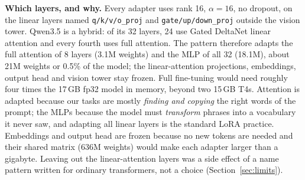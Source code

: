 \documentclass[11pt,a4paper]{article}
\begin{document}
\textbf{Which layers, and why.} Every adapter uses rank 16, $\alpha=16$, no dropout, on the linear layers named
\texttt{q/k/v/o\_proj} and \texttt{gate/up/down\_proj} outside the vision tower. Qwen3.5 is a hybrid: of its 32 layers,
24 use Gated DeltaNet linear attention and every fourth uses full attention. The pattern therefore adapts the full
attention of 8 layers (3.1M weights) and the MLP of all 32 (18.1M), about 21M weights or 0.5\% of the model; the
linear-attention projections, embeddings, output head and vision tower stay frozen. Full fine-tuning would need
roughly four times the 17\,GB fp32 model in memory, beyond two 15\,GB T4s. Attention is adapted because our tasks are
mostly \emph{finding and copying} the right words of the prompt; the MLPs because the model must \emph{transform}
phrases into a vocabulary it never saw, and adapting all linear layers is the standard LoRA practice. Embeddings and output head are frozen because no new tokens are needed and their shared matrix
(636M weights) would make each adapter larger than a gigabyte. Leaving out the linear-attention layers was a side
effect of a name pattern written for ordinary transformers, not a choice (Section~\ref{sec:limits}).
\end{document}
